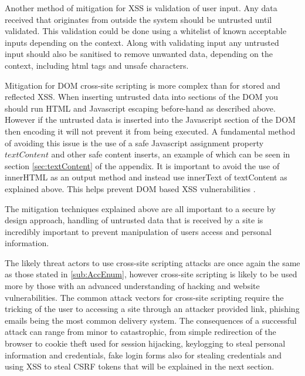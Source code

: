 \documentclass{ueacmpstyle}
\begin{document}
      Another method of mitigation for XSS is validation of user input. Any data received 
      that originates from outside the system should be untrusted until validated. This 
      validation could be done using a whitelist of known acceptable inputs depending on 
      the context.
      Along with validating input any untrusted input should also be sanitised to remove 
      unwanted data, depending on the context, including html tags and unsafe characters. 

      Mitigation for DOM cross-site scripting is more complex than for stored and reflected 
      XSS. When inserting untrusted data into sections of the DOM you should run HTML and 
      Javascript escaping before-hand as described above. However if the untrusted data is 
      inserted into the Javascript section of the DOM then encoding it will not prevent it 
      from being executed. A fundamental method of avoiding this issue is the use of a safe 
      Javascript assignment property $textContent$ and other safe content inserts, an example 
      of which can be seen in section \ref{sec:textContent} of the appendix. It is important 
      to avoid the use of innerHTML as an output method and instead use innerText of 
      textContent as explained above. This helps prevent DOM based XSS vulnerabilities 
      \citep{OWASPDOMXSSPrevention}. 

      The mitigation techniques explained above are all important to a secure by design 
      approach, handling of untrusted data that is received by a site is incredibly important 
      to prevent manipulation of users access and personal information.

      The likely threat actors to use cross-site scripting attacks are once again the 
      same as those stated in \ref{sub:AccEnum}, however cross-site scripting is likely to be 
      used more by those with an advanced understanding of hacking and website vulnerabilities. 
      The common attack vectors for cross-site scripting require the tricking of the user to 
      accessing a site through an attacker provided link, phishing emails being the most common 
      delivery system. The consequences of a successful attack can range from minor to 
      catastrophic, from simple redirection of the browser to cookie theft used for session 
      hijacking, keylogging to steal personal information and credentials, fake login forms also 
      for stealing credentials and using XSS to steal CSRF tokens that will be explained in 
      the next section.
\end{document}
